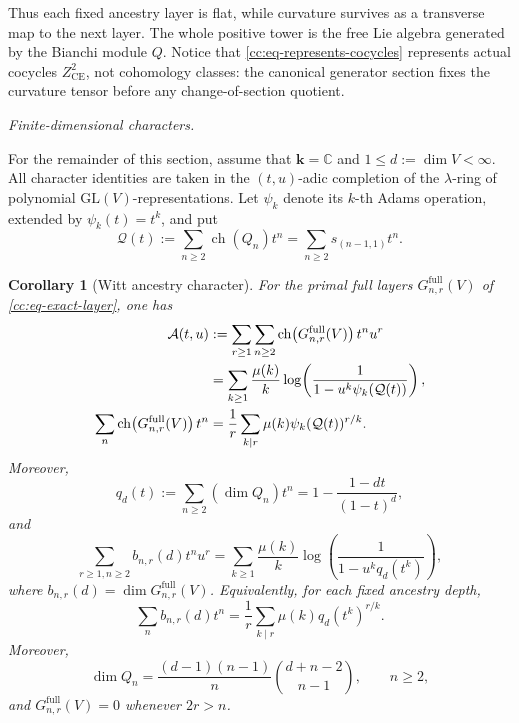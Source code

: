 \documentclass[10pt,reqno]{amsart}
\theoremstyle{plain}
\newtheorem{corollary}[theorem]{Corollary}
\theoremstyle{definition}
\theoremstyle{remark}
\begin{document}
Thus each fixed ancestry layer is flat, while curvature survives as a
transverse map to the next layer.  The whole positive tower is the free
Lie algebra generated by the Bianchi module \(Q\).  Notice that
\eqref{cc:eq-represents-cocycles} represents actual cocycles
\(Z^2_{\mathrm{CE}}\), not cohomology classes: the canonical generator
section fixes the curvature tensor before any change-of-section quotient.

\medskip
\noindent\textit{Finite-dimensional characters.}

For the remainder of this section, assume that \(\mathbf k=\mathbb C\) and
\(1\leq d:=\dim V<\infty\).  All character identities are taken in the
\((t,u)\)-adic completion of the \(\lambda\)-ring of polynomial
\(\mathrm{GL}(V)\)-representations.  Let \(\psi_k\) denote its \(k\)-th
Adams operation, extended by \(\psi_k(t)=t^k\), and put
\begin{equation}
 \mathcal Q(t):=\sum_{n\geq2}\operatorname{ch}(Q_n)t^n
 =\sum_{n\geq2}s_{(n-1,1)}t^n.
 \label{cc:eq-Q-character}
\end{equation}

\begin{corollary}[Witt ancestry character]
\label{cc:cor-witt-character}
For the primal full layers \(G^{\mathrm{full}}_{n,r}(V)\) of
\eqref{cc:eq-exact-layer}, one has
\begin{align}
 \mathcal A(t,u)
 &:=\sum_{r\geq1}\sum_{n\geq2}
 \operatorname{ch}\!\left(G^{\mathrm{full}}_{n,r}(V)\right)t^nu^r
 \notag\\
 &=\sum_{k\geq1}\frac{\mu(k)}{k}
 \log\!\left(\frac{1}{1-u^k\psi_k(\mathcal Q(t))}\right),
 \label{cc:eq-plethystic-witt}\\
 \sum_n\operatorname{ch}\!\left(G^{\mathrm{full}}_{n,r}(V)\right)t^n
 &=\frac1r\sum_{k\mid r}\mu(k)
 \psi_k(\mathcal Q(t))^{r/k}.
 \label{cc:eq-layer-witt}
\end{align}
Moreover,
\begin{equation}
 q_d(t):=\sum_{n\geq2}(\dim Q_n)t^n
 =1-\frac{1-dt}{(1-t)^d},
 \label{cc:eq-Q-hilbert}
\end{equation}
and
\begin{equation}
 \sum_{r\geq1,n\geq2}b_{n,r}(d)t^nu^r
 =\sum_{k\geq1}\frac{\mu(k)}{k}
 \log\!\left(\frac{1}{1-u^kq_d(t^k)}\right),
 \label{cc:eq-dimension-witt}
\end{equation}
where \(b_{n,r}(d)=\dim G^{\mathrm{full}}_{n,r}(V)\).
Equivalently, for each fixed ancestry depth,
\begin{equation}
 \sum_n b_{n,r}(d)t^n
 =\frac1r\sum_{k\mid r}\mu(k)
 q_d(t^k)^{r/k}.
 \label{cc:eq-fixed-depth-dimension}
\end{equation}
Moreover,
\begin{equation}
 \dim Q_n
 =\frac{(d-1)(n-1)}{n}\binom{d+n-2}{n-1},
 \qquad n\geq2,
 \label{cc:eq-Q-dimension}
\end{equation}
and \(G^{\mathrm{full}}_{n,r}(V)=0\) whenever \(2r>n\).
\end{corollary}
\end{document}

